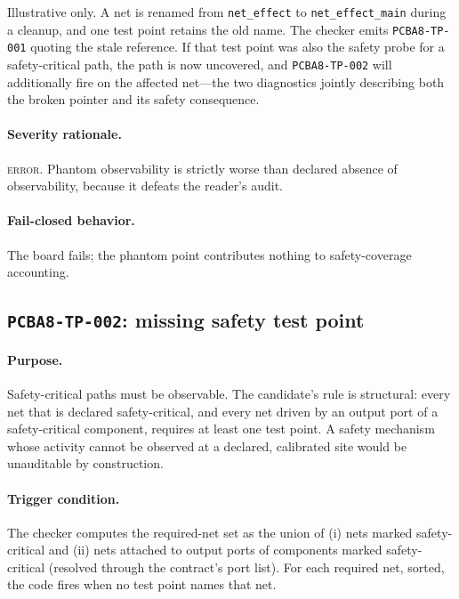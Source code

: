 \begin{example}\label{ch07:ex:tp001}
Illustrative only. A net is renamed from \texttt{net\_effect} to \texttt{net\_effect\_main} during a cleanup, and one test point retains the old name. The checker emits \texttt{PCBA8-TP-001} quoting the stale reference. If that test point was also the safety probe for a safety-critical path, the path is now uncovered, and \texttt{PCBA8-TP-002} will additionally fire on the affected net---the two diagnostics jointly describing both the broken pointer and its safety consequence.
\end{example}

\paragraph{Severity rationale.} \textsc{error}. Phantom observability is strictly worse than declared absence of observability, because it defeats the reader's audit.

\paragraph{Fail-closed behavior.} The board fails; the phantom point contributes nothing to safety-coverage accounting.

\subsection{\texttt{PCBA8-TP-002}: missing safety test point}\label{ch07:sub:tp002}

\paragraph{Purpose.} Safety-critical paths must be observable. The candidate's rule is structural: every net that is declared safety-critical, and every net driven by an output port of a safety-critical component, requires at least one test point. A safety mechanism whose activity cannot be observed at a declared, calibrated site would be unauditable by construction.

\paragraph{Trigger condition.} The checker computes the required-net set as the union of (i) nets marked safety-critical and (ii) nets attached to output ports of components marked safety-critical (resolved through the contract's port list). For each required net, sorted, the code fires when no test point names that net.

